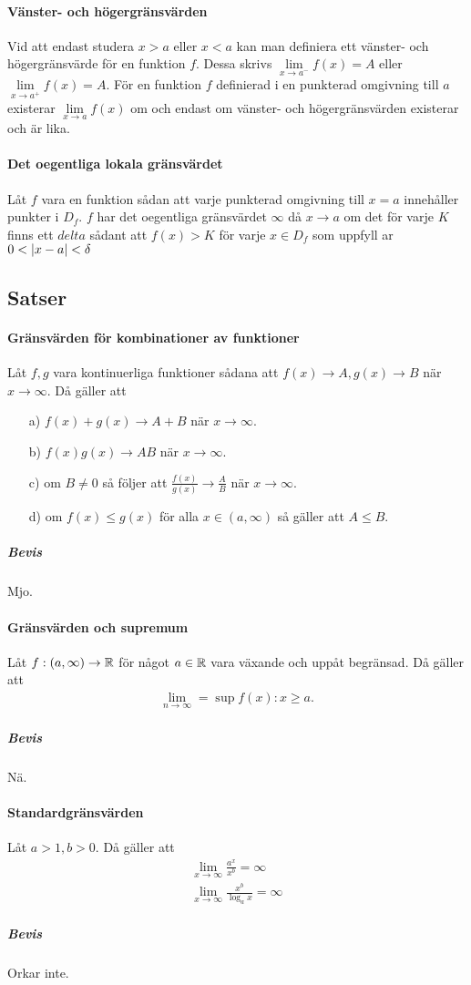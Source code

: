 \paragraph{Vänster- och högergränsvärden}
Vid att endast studera $x > a$ eller $x < a$ kan man definiera ett vänster- och högergränsvärde för en funktion $f$. Dessa skrivs $\lim\limits_{x\to a^-} f(x) = A$ eller $\lim\limits_{x\to a^+} f(x) = A$. För en funktion $f$ definierad i en punkterad omgivning till $a$ existerar $\lim\limits_{x\to a} f(x)$ om och endast om vänster- och högergränsvärden existerar och är lika.

\paragraph{Det oegentliga lokala gränsvärdet}
Låt $f$ vara en funktion sådan att varje punkterad omgivning till  $x = a$ innehåller punkter i $D_f$. $f$ har det oegentliga gränsvärdet $\infty$ då $x\to a$ om det för varje $K$ finns ett $delta$ sådant att $f(x) > K$ för varje $x\in D_f$ som uppfyll	ar $0 < \abs{x - a} < \delta$

\subsection{Satser}

\paragraph{Gränsvärden för kombinationer av funktioner}
Låt $f,g$ vara kontinuerliga funktioner sådana att $f(x)\to A, g(x)\to B$ när $x\to\infty$. Då gäller att
\begin{itemize}
	\item[a)] $f(x) + g(x)\to A + B$ när $x\to\infty$.
	\item[b)] $f(x)g(x)\to AB$ när $x\to\infty$.
	\item[c)] om $B\neq 0$ så följer att $\frac{f(x)}{g(x)}\to\frac{A}{B}$ när $x\to\infty$.
	\item[d)] om $f(x)\leq g(x)$ för alla $x\in (a,\infty)$ så gäller att $A\leq B$.
\end{itemize}

\subparagraph{Bevis}
Mjo.

\paragraph{Gränsvärden och supremum}
Låt $f: (a, \infty)\to\mathbb{R}$ för något $a\in\mathbb{R}$ vara växande och uppåt begränsad. Då gäller att
\begin{align*}
	\lim\limits_{n\to\infty} = \sup{f(x): x\geq a}.
\end{align*}

\subparagraph{Bevis}
Nä.

\paragraph{Standardgränsvärden}
Låt $a > 1, b > 0$. Då gäller att
\begin{align*}
	\lim\limits_{x\to\infty}\frac{a^x}{x^b} = \infty \\
	\lim\limits_{x\to\infty}\frac{x^b}{\log_a x} = \infty
\end{align*}

\subparagraph{Bevis}
Orkar inte.